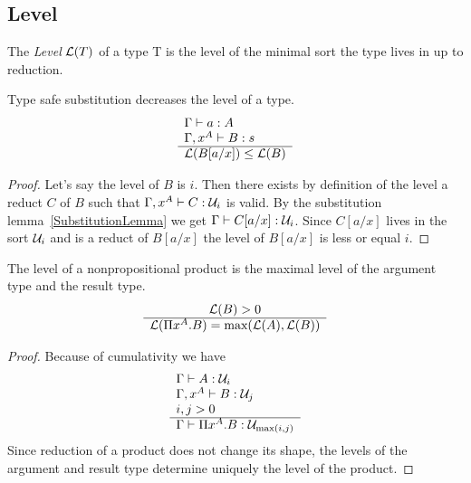 \subsection{Level}


\begin{definition}
    The \emph{Level} ${\cal L}(T)$ of a type T is the level of the minimal sort
    the type lives in up to reduction.
\end{definition}


\begin{theorem}
    \label{thm:LevelTypeSafeSubstitution}
    Type safe substitution decreases the level of a type.
    $$
    \begin{array}{l} 
        \Gamma \vdash a : A
        \\
        \Gamma, x^A \vdash B: s
     \\ \hline 
        {\cal L}(B[a/x]) \le {\cal L}(B)
    \end{array}
    $$
    \begin{proof}
        Let's say the level of $B$ is $i$. Then there exists by definition of
        the level a reduct $C$ of $B$ such that $\Gamma, x^A \vdash C: {\cal U}_i$
        is valid. By the substitution lemma~\ref{SubstitutionLemma} we get
        $\Gamma \vdash C[a/x]: {\cal U}_i$. Since $C[a/x]$ lives in the sort
        ${\cal U}_i$ and is a reduct of $B[a/x]$ the level of $B[a/x]$ is less or
        equal $i$.
    \end{proof}
\end{theorem}




\begin{theorem}
    \label{thm:LevelProduct}
    The level of a nonpropositional product is the maximal level of the argument
    type and the result type.
    $$
    \begin{array}{c} 
        {\cal L}(B) > 0
     \\ \hline 
        {\cal L}(\Pi x^A.B) = {\text{max}}({\cal L}(A), {\cal L}(B))
    \end{array}
    $$
    \begin{proof}
        Because of cumulativity we have
        $$
        \begin{array}{l} 
            \Gamma \vdash A: {\cal U}_i
            \\
            \Gamma,x^A \vdash B: {\cal U}_j
            \\
            i,j > 0
         \\ \hline 
            \Gamma \vdash \Pi x^A. B : {\cal U}_{{\text{max}}(i,j)}
        \end{array}
        $$
        Since reduction of a product does not change its shape, the levels of
        the argument and result type determine uniquely the level of the
        product.
    \end{proof}
\end{theorem}




